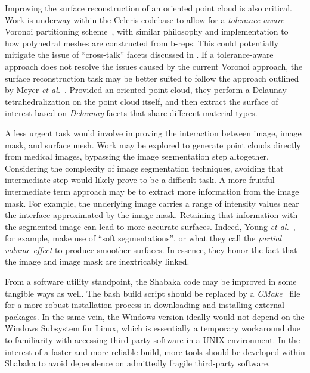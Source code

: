 Improving the surface reconstruction of an oriented point cloud is also critical. Work is underway within the Celeris codebase to allow for a \textit{tolerance-aware} Voronoi partitioning scheme~\cite{rashid_2019}, with similar philosophy and implementation to how polyhedral meshes are constructed from b-reps. This could potentially mitigate the issue of ``cross-talk'' facets discussed in . If a tolerance-aware approach does not resolve the issues caused by the current Voronoi approach, the surface reconstruction task may be better suited to follow the approach outlined by Meyer \textit{et al.}~\cite{meyer_2008}. Provided an oriented point cloud, they perform a Delaunay tetrahedralization on the point cloud itself, and then extract the surface of interest based on \textit{Delaunay} facets that share different material types.

A less urgent task would involve improving the interaction between image, image mask, and surface mesh. Work may be explored to generate point clouds directly from medical images, bypassing the image segmentation step altogether. Considering the complexity of image segmentation techniques, avoiding that intermediate step would likely prove to be a difficult task. A more fruitful intermediate term approach may be to extract more information from the image mask. For example, the underlying image carries a range of intensity values near the interface approximated by the image mask. Retaining that information with the segmented image can lead to more accurate surfaces. Indeed, Young \textit{et al.}~\cite{young_2008}, for example, make use of ``soft segmentations'', or what they call the \textit{partial volume effect} to produce smoother surfaces. In essence, they honor the fact that the image and image mask are inextricably linked.

From a software utility standpoint, the Shabaka code may be improved in some tangible ways as well. The bash build script should be replaced by a \textit{CMake}~\cite{cmake} file for a more robust installation process in downloading and installing external packages. In the same vein, the Windows version ideally would not depend on the Windows Subsystem for Linux, which is essentially a temporary workaround due to familiarity with accessing third-party software in a UNIX environment. In the interest of a faster and more reliable build, more tools should be developed within Shabaka to avoid dependence on admittedly fragile third-party software.

